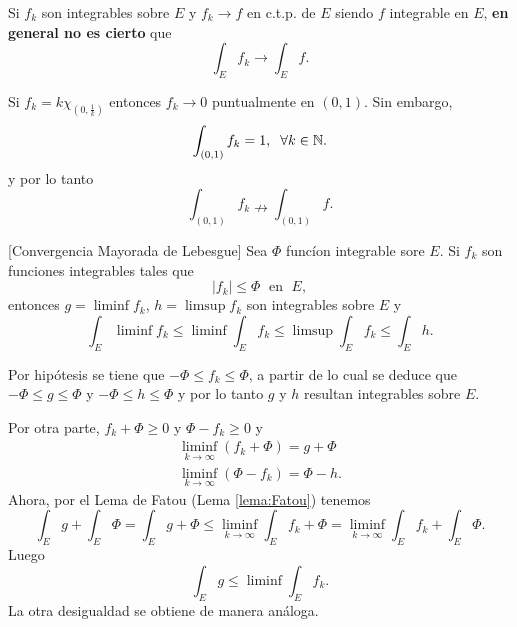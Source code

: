                     
                    Si $f_k$ son integrables sobre $E$ y $f_k \to f$ en c.t.p. de $E$ siendo $f$  integrable en $E$, \textbf{en general no es cierto} que 
                    \[
                    \int_E f_k \to \int_E f.
                    \]
                    
                    \begin{ejemplo}{}
                    Si $f_k=k \chi_{(0,\frac{1}{k})}$ entonces $f_k \to 0$ puntualmente en $(0,1)$. Sin embargo,
                     \[
                    \int_{(0,1)} f_k = 1,\;\; \forall k\in \mathbb{N}.
                    \]
                     y por lo tanto 
                     \[
                    \int_{(0,1)} f_k  \nrightarrow \int_{(0,1)} f.
                    \]
                    \end{ejemplo}
                    
                    \begin{teorema}{}[Convergencia Mayorada de Lebesgue]
                    Sea $\Phi$ func\'ion integrable sore $E$. 
                    Si $f_k$ son funciones integrables tales que 
                    \[|f_k|\leq \Phi\;\mbox{ en }\;E,\]    
                    entonces
                    $g=\liminf f_k$, $h=\limsup
                    f_k$ son integrables sobre $E$ y 
                    \[
                    \int_E \liminf f_k \leq 
                    \liminf \int_E f_k \leq\limsup \int_E f_k
                    \leq \int_E h.
                    \]
                    \end{teorema}
                    
                    \begin{demo}
                    Por hip\'otesis se tiene que $-\Phi \leq f_k \leq \Phi$, a partir de lo cual se deduce que 
                    $-\Phi \leq g\leq \Phi$ y  $-\Phi \leq h\leq \Phi$ y por lo tanto $g$ y $h$ resultan integrables sobre $E$.
                    
                    Por otra parte,  $f_k+\Phi \geq 0$ y $\Phi-f_k\geq 0$ y 
                    \[\begin{split}
                    \liminf\limits_{k \to \infty} (f_k+\Phi)=g+\Phi
                    \\
                    \liminf\limits_{k \to \infty} (\Phi-f_k)=\Phi-h.
                    \end{split}
                    \]
                    Ahora, por el Lema de Fatou (Lema \ref{lema:Fatou}) tenemos
                    \[
                    \int_E g + \int_E \Phi =
                    \int_E g+\Phi \leq \liminf\limits_{k \to \infty} \int_E f_k +\Phi=
                    \liminf\limits_{k \to \infty} \int_E f_k +\int_E \Phi.
                    \]
                    Luego 
                    \[
                    \int_E g \leq \liminf \int_E f_k.
                    \]
                    La otra desigualdad se obtiene de manera an\'aloga.
                    \end{demo}
                    
